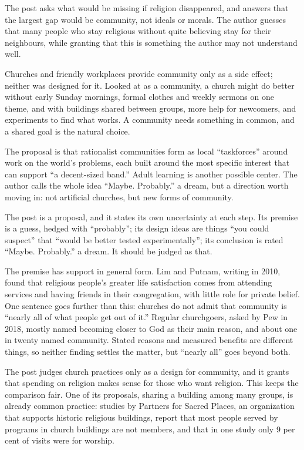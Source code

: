 \begin{afterword}
\summaryhead

The post asks what would be missing if religion disappeared, and answers that the largest gap would be community, not ideals or morals. The author guesses that many people who stay religious without quite believing stay for their neighbours, while granting that this is something the author may not understand well.

Churches and friendly workplaces provide community only as a side effect; neither was designed for it. Looked at as a community, a church might do better without early Sunday mornings, formal clothes and weekly sermons on one theme, and with buildings shared between groups, more help for newcomers, and experiments to find what works. A community needs something in common, and a shared goal is the natural choice.

The proposal is that rationalist communities form as local ``taskforces'' around work on the world's problems, each built around the most specific interest that can support ``a decent-sized band.'' Adult learning is another possible center. The author calls the whole idea ``Maybe. Probably.'' a dream, but a direction worth moving in: not artificial churches, but new forms of community.

\responsehead

The post is a proposal, and it states its own uncertainty at each step. Its premise is a guess, hedged with ``probably''; its design ideas are things ``you could suspect'' that ``would be better tested experimentally''; its conclusion is rated ``Maybe. Probably.'' a dream. It should be judged as that.

The premise has support in general form. Lim and Putnam, writing in 2010, found that religious people's greater life satisfaction comes from attending services and having friends in their congregation, with little role for private belief. One sentence goes further than this: churches do not admit that community is ``nearly all of what people get out of it.'' Regular churchgoers, asked by Pew in 2018, mostly named becoming closer to God as their main reason, and about one in twenty named community. Stated reasons and measured benefits are different things, so neither finding settles the matter, but ``nearly all'' goes beyond both.

The post judges church practices only as a design for community, and it grants that spending on religion makes sense for those who want religion. This keeps the comparison fair. One of its proposals, sharing a building among many groups, is already common practice: studies by Partners for Sacred Places, an organization that supports historic religious buildings, report that most people served by programs in church buildings are not members, and that in one study only 9 per cent of visits were for worship.


\end{afterword}
